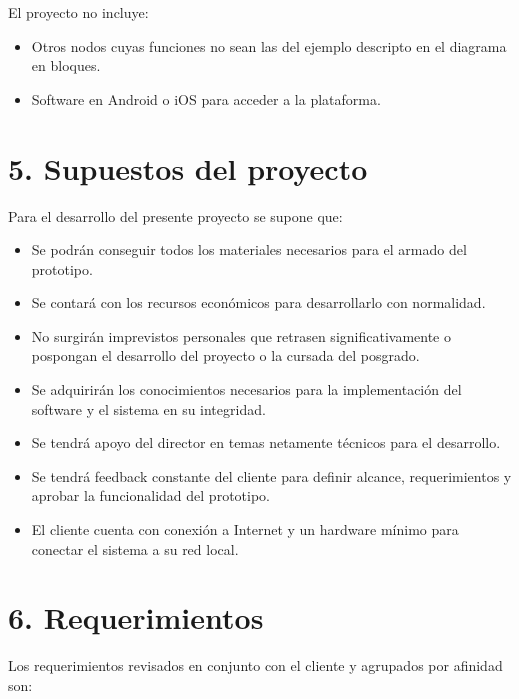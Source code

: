 \documentclass[
11pt, %
]{charter}
\begin{document}
El proyecto no incluye:
\begin{itemize}
	\item Otros nodos cuyas funciones no sean las del ejemplo descripto en el diagrama en bloques.
	\item Software en Android o iOS para acceder a la plataforma.
\end{itemize}

\section{5. Supuestos del proyecto}
\label{sec:supuestos}

Para el desarrollo del presente proyecto se supone que:
\begin{itemize}
	\item Se podrán conseguir todos los materiales necesarios para el armado del prototipo.
	\item Se contará con los recursos económicos para desarrollarlo con normalidad.
	\item No surgirán imprevistos personales que retrasen significativamente o pospongan el desarrollo del proyecto o la cursada del posgrado.
	\item Se adquirirán los conocimientos necesarios para la implementación del software y el sistema en su integridad.
	\item Se tendrá apoyo del director en temas netamente técnicos para el desarrollo.
	\item Se tendrá feedback constante del cliente para definir alcance, requerimientos y aprobar la funcionalidad del prototipo.
	\item El cliente cuenta con conexión a Internet y un hardware mínimo para conectar el sistema a su red local.
\end{itemize}

\section{6. Requerimientos}
\label{sec:requerimientos}

Los requerimientos revisados en conjunto con el cliente y agrupados por afinidad son:
\end{document}
